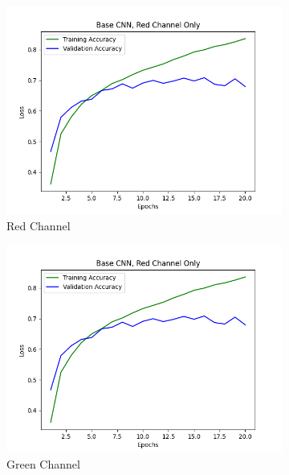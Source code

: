 \documentclass{article}
\begin{document}
    \begin{figure}
        \begin{subfigure}[h]{0.5\linewidth}
            \includegraphics[width=\linewidth]{Base CNN, Red Channel Only}
            \caption{Red Channel}
        \end{subfigure}
        \hfill
        \begin{subfigure}[h]{0.5\linewidth}
            \includegraphics[width=\linewidth]{Base CNN, Red Channel Only}
            \caption{Green Channel}
        \end{subfigure}
        \hfill
        \begin{subfigure}[h]{0.5\linewidth}

\end{subfigure}
\end{figure}
\end{document}
